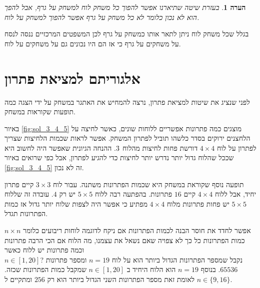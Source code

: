 \documentclass[12pt,leqno]{article}
\theoremstyle{theoremdd}
\newtheorem{comm}{הערה}[section]
\begin{document}
\begin{comm}
    בעזרת שיטה שתיארנו אפשר להפוך כל משחק לוח למשחק על גרף, אבל להפך הוא לא נכון 
    כלומר לא כל משחק על גרף אפשר להפוך למשחק על לוח.
\end{comm}

בגלל שכל משחק לוח ניתן לתאר אותו כמשחק על גרף לכן המשפטים המרכזיים ננסה לנסח על משחקים על גרף כי אז הם היו נכונים
גם על משחקים על לוח.


\newpage

\section{ אלגוריתם למציאת פתרון}

לפני שנציג את שיטות למציאת פתרון, נרצה להמחיש את 
האתגר במשחק על ידי הצגה כמה תופעות שקוראות במשחק.

באיור
\ref{fig:sol_3_4_5}
מוצגים כמה פתרונות אפשריים ללוחות שונים, כאשר לחיצה על הלחצנים ירוקים
בסדר כלשהו תוביל לפתרון המשחק.
אפשר לראות שכמות הלחיצות שצריך לפתרון 
על לוח 
$4 \times 4$
דורשת פחות לחיצות מהלוח 
$3 \time 3$.
ההנחה הגיונית 
שאפשר היה לחשוב היא שככל שהלוח גדול יותר נדרש 
יותר לחיצות 
כדי להגיע לפתרון,
אבל כפי שרואים 
באיור 
\ref{fig:sol_3_4_5}
זה לא נכון.

תופעה נוסף שקוראת במשחק היא שכמות הפתרונות משתנה.
עבור לוח 
$3 \times 3$
קיים פתרון יחיד,
אבל ללוח 
$4 \times 4$
קיים
$16$
פתרונות.
בהפתעה רבה ללוח 
$5 \times 5$
יש רק 
$4$.
עובדה זה שללוח 
$5 \times 5$
יש פחות פתרונות מלוח 
$4 \times 4$
מפתיע כי אפשר היה לצפות שלוח יותר גדול אז כמות הפתרונות תגדל.

אפשר לחדד את חוסר הבנה לכמות הפתרונות אם ניקח לדוגמה לוחות ריבועים כלומר
$n \times n$
כמות הפתרונות כל כך לא צפויה
שאם נשאל את עצמנו, מה הלוח אם הכי הרבה פתרונות וכמה פתרונות יש ללוח כאשר
\\
$n \in [1,20]$?
נקבל שמספר הפתרונות הגדול ביותר הוא על לוח
$n = 19$ 
ומספר פתרונות 
$65536$.
בנוסף
$n = 19$ 
הוא הלוח היחיד ב
$n \in [1,20]$
שמקבל
כמות הפתרונות שכזה.
לאומת זאת
מספר הפתרונות השני הגדול ביותר הוא רק
$256$
ומתקיים ל
$n \in \{9, 16 \}$.
\end{document}
